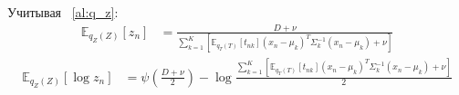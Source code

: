 \documentclass[12pt, a4paper]{article}
\begin{document}
        Учитывая ~\ref{al:q_z}:
        \begin{align*}
            \mathbb{E}_{q_Z(Z)}\left[z_{n}\right] & = \frac{D + \nu}{\sum_{k=1}^{K}\left[\mathbb{E}_{q_T(T)}\left[t_{nk}\right](x_n - \mu_k)^T\Sigma_k^{-1}(x_n - \mu_k) + \nu\right]}
        \end{align*}
        \begin{align*}
            \mathbb{E}_{q_Z(Z)}\left[\log z_{n}\right] & = \psi\left(\frac{D + \nu}{2}\right) - \log \frac{\sum_{k=1}^{K}\left[\mathbb{E}_{q_T(T)}\left[t_{nk}\right](x_n - \mu_k)^T\Sigma_k^{-1}(x_n - \mu_k) + \nu\right]}{2}
        \end{align*}
\end{document}
